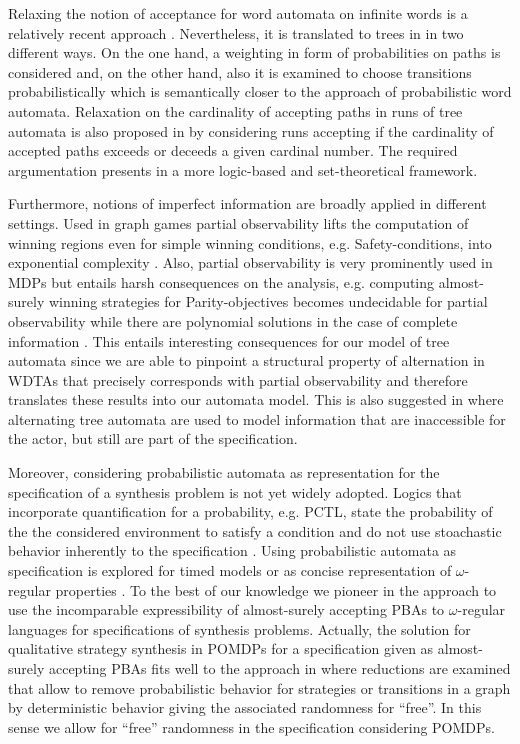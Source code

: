 Relaxing the notion of acceptance for word automata on infinite words is a
relatively recent approach \cite{PBAcoin,Groesser,RecOmeLangProbAuto,%
DecProblemsForProbAuto}. Nevertheless, it is translated to trees in
\cite{RandAutoInfTrees,QualTreeLang} in two different ways. On the one hand, a
weighting in form of probabilities on paths is considered and, on the other
hand, also it is examined to choose transitions probabilistically which is
semantically closer to the approach of probabilistic word automata. Relaxation
on the cardinality of accepting paths in runs of tree automata is also proposed
in \cite{CardinalsForTreePaths} by considering runs accepting if the
cardinality of accepted paths exceeds or deceeds a given cardinal number. The
required argumentation presents in a more logic-based and set-theoretical
framework.

Furthermore, notions of imperfect information are broadly applied in different
settings. Used in graph games partial observability lifts the computation of
winning regions even for simple winning conditions, e.g. Safety-conditions,
into exponential complexity \cite{PowerOfImperfectInformation}. Also, partial
observability is very prominently used in \aclp*{MDP} \cite{RandomnessForFree,%
ActingOptimallyInPOSD, QualAnaPOMDP} but entails harsh consequences on the
analysis, e.g. computing almost-surely winning strategies for Parity-objectives
becomes undecidable for partial observability while there are polynomial
solutions in the case of complete information \cite{QualAnaPOMDP,%
QuanStochParityGames}. This entails interesting consequences for our model of
tree automata since we are able to pinpoint a structural property of
alternation in \aclp*{WDTA} that precisely corresponds with partial
observability and therefore translates these results into our automata model.
This is also suggested in \cite{ChurchsProblemRevisited} where alternating tree
automata are used to model information that are inaccessible for the actor, but
still are part of the specification.

Moreover, considering probabilistic automata as representation for the
specification of a synthesis problem is not yet widely adopted. Logics that
incorporate quantification for a probability, e.g. \textsc{PCTL}, state the
probability of the the considered environment to satisfy a condition and do not
use stoachastic behavior inherently to the specification \cite{PrinciplesOfMC}.
Using probabilistic automata as specification is explored for timed models
\cite{VerificationAndControl} or as concise representation of $\omega$-regular
properties \cite{PBAforLTLSafety}. To the best of our knowledge we pioneer in
the approach to use the incomparable expressibility of almost-surely accepting
\aclp*{PBA} to $\omega$-regular languages for specifications of synthesis
problems. Actually, the solution for qualitative strategy synthesis in
\aclp*{POMDP} for a specification given as almost-surely accepting \aclp*{PBA}
fits well to the approach in \cite{RandomnessForFree} where reductions are
examined that allow to remove probabilistic behavior for strategies or
transitions in a graph by deterministic behavior giving the associated
randomness for \enquote{free}. In this sense we allow for \enquote{free}
randomness in the specification considering \aclp*{POMDP}.
